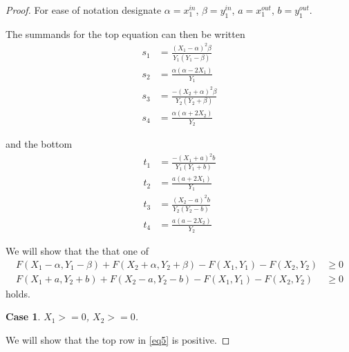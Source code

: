 \documentclass{article}
\theoremstyle{case}
\newtheorem{case}{Case}
\begin{document}
\begin{proof}
For ease of notation designate $\alpha = x_1^{in}$, $\beta = y_1^{in}$, $a = x_1^{out}$, $b = y_1^{out}$.

The summands for the top equation can then be written
\begin{align*}
s_1 & = \frac{\left(X_1 - \alpha\right)^2\beta}{Y_1\left( Y_1 - \beta\right)} \\
s_2 & = \frac{\alpha \left( \alpha - 2X_1\right)}{Y_1} \\
s_3 & = \frac{-\left( X_2 + \alpha\right)^2\beta}{Y_2\left( Y_2 + \beta\right)} \\
s_4 & = \frac{\alpha\left( \alpha + 2X_2\right)}{Y_2}
\end{align*}

and the bottom
\begin{align*}
t_1 & = \frac{-\left( X_1 + a\right)^2 b}{Y_1\left( Y_1 + b\right)} \\
t_2 & = \frac{a\left( a + 2X_1\right)}{Y_1} \\
t_3 & = \frac{\left( X_2 - a\right)^2b}{Y_2\left( Y_2 - b\right)} \\
t_4 & = \frac{a\left( a - 2X_2\right)}{Y_2}
\end{align*}

We will show that the that one of
\begin{align} \label{eq5}
F(X_1 - \alpha, Y_1 - \beta) + F(X_2 + \alpha, Y_2 + \beta) - F(X_1, Y_1) - F(X_2, Y_2) & \geq 0 \\
F(X_1 + a, Y_2 +b) + F(X_2 - a, Y_2 - b) - F(X_1, Y_1) - F(X_2, Y_2) & \geq 0
\end{align}
holds.


\begin{case} 
$X_1 >= 0$, $X_2 >= 0$. 
\end{case}
We will show that the top row in \ref{eq5} is positive.

\vspace{12pt}


\end{proof}
\end{document}
